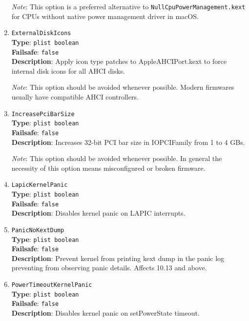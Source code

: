 \documentclass[]{article}
\begin{document}
\begin{enumerate}
  \emph{Note}: This option is a preferred alternative to
  \texttt{NullCpuPowerManagement.kext} for CPUs without native power
  management driver in macOS.

\item
  \texttt{ExternalDiskIcons}\\
  \textbf{Type}: \texttt{plist\ boolean}\\
  \textbf{Failsafe}: \texttt{false}\\
  \textbf{Description}: Apply icon type patches to AppleAHCIPort.kext to force
  internal disk icons for all AHCI disks.

  \emph{Note}: This option should be avoided whenever possible. Modern firmwares
  usually have compatible AHCI controllers.

\item
  \texttt{IncreasePciBarSize}\\
  \textbf{Type}: \texttt{plist\ boolean}\\
  \textbf{Failsafe}: \texttt{false}\\
  \textbf{Description}: Increases 32-bit PCI bar size in IOPCIFamily from 1 to 4 GBs.

  \emph{Note}: This option should be avoided whenever possible. In general the necessity
  of this option means misconfigured or broken firmware.

\item
  \texttt{LapicKernelPanic}\\
  \textbf{Type}: \texttt{plist\ boolean}\\
  \textbf{Failsafe}: \texttt{false}\\
  \textbf{Description}: Disables kernel panic on LAPIC interrupts.

\item
  \texttt{PanicNoKextDump}\\
  \textbf{Type}: \texttt{plist\ boolean}\\
  \textbf{Failsafe}: \texttt{false}\\
  \textbf{Description}: Prevent kernel from printing kext dump in the panic
  log preventing from observing panic details. Affects 10.13 and above.

\item
  \texttt{PowerTimeoutKernelPanic}\\
  \textbf{Type}: \texttt{plist\ boolean}\\
  \textbf{Failsafe}: \texttt{false}\\
  \textbf{Description}: Disables kernel panic on setPowerState timeout.


\end{enumerate}
\end{document}
